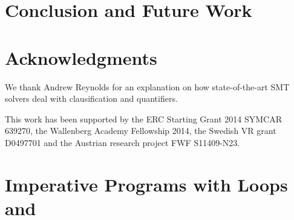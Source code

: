\section{Conclusion and Future Work}
\label{sec:newcnf/conclusions}


\section*{Acknowledgments}
We thank Andrew Reynolds for an explanation on how state-of-the-art SMT solvers deal with clausification and quantifiers. 

This work has been supported by the ERC Starting Grant 2014 SYMCAR 639270, the Wallenberg Academy Fellowship 2014, the Swedish VR grant D0497701 and the Austrian research project FWF S11409-N23.


\section{Imperative Programs with Loops and \ITE}
\label{sec:newcnf/examples}


